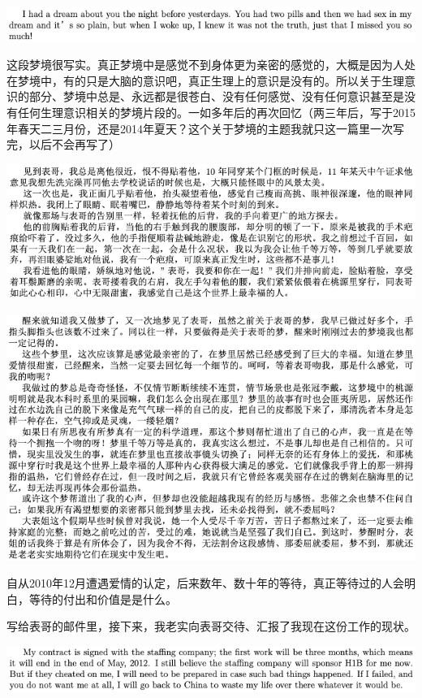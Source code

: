 \documentclass[9pt, b5paper]{article}
\begin{document}
\begin{center}
\includegraphics[width=.9\linewidth]{./pic/p1p116-5.png}
\end{center}

这段梦境很写实。真正梦境中是感觉不到身体更为亲密的感觉的，大概是因为人处在梦境中，有的只是大脑的意识吧，真正生理上的意识是没有的。所以关于生理意识的部分、梦境中总是、永远都是很苍白、没有任何感觉、没有任何意识甚至是没有任何生理意识相关的梦境片段的。一如多年后的再次回忆（两三年后，写于2015年春天二三月份，还是2014年夏天？这个关于梦境的主题我就只这一篇里一次写完，以后不会再写了）

\begin{center}
\includegraphics[width=.9\linewidth]{./pic/p4p17.png}
\end{center}

\begin{center}
\includegraphics[width=.9\linewidth]{./pic/p4p19.png}
\end{center}

自从2010年12月遭遇爱情的认定，后来数年、数十年的等待，真正等待过的人会明白，等待的付出和价值是是什么。

写给表哥的邮件里，接下来，我老实向表哥交待、汇报了我现在这份工作的现状。 

\begin{center}
\includegraphics[width=.9\linewidth]{./pic/p1p116-6.png}
\end{center}
\end{document}
